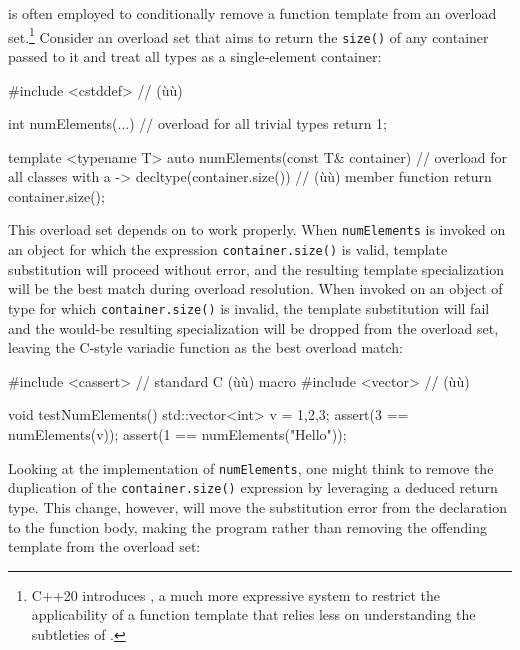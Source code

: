  is often employed to
conditionally remove a function template from an overload
set.{\cprotect\footnote{C++20 introduces , a much more
expressive system to restrict the applicability of a function template
  that relies less on understanding the subtleties of .}}
Consider an overload set that aims to return the \lstinline!size()! of any
container passed to it and treat all  types as a
single-element container:

\begin{emcppslisting}
#include <cstddef>  // (ù{}ù)

int numElements(...)  // overload for all trivial types
{
    return 1;
}

template <typename T>
auto numElements(const T& container)  // overload for all classes with a
   -> decltype(container.size())      // (ù{}ù) member function
{
    return container.size();
}
\end{emcppslisting}
    

\noindent This overload set depends on  to work properly. When
\lstinline!numElements! is invoked on an object for which the expression
\lstinline!container.size()! is valid, template substitution will proceed
without error, and the resulting template specialization will be the
best match during overload resolution. When invoked on an object of
 type for which \lstinline!container.size()! is invalid,
the template substitution will fail and the would-be resulting
specialization will be dropped from the overload set, leaving the
C-style variadic function as the best overload match:

\begin{emcppslisting}
#include <cassert>  // standard C (ù{}ù) macro
#include <vector>   // (ù{}ù)

void testNumElements()
{
   std::vector<int> v = {1,2,3};
   assert(3 == numElements(v));
   assert(1 == numElements("Hello"));
}
\end{emcppslisting}
    

\noindent Looking at the implementation of \lstinline!numElements!, one might think
to remove the duplication of the \lstinline!container.size()! expression by
leveraging a deduced return type. This change, however, will move the
substitution error from the declaration to the function body, making the
program  rather than removing the offending template
from the overload set:

